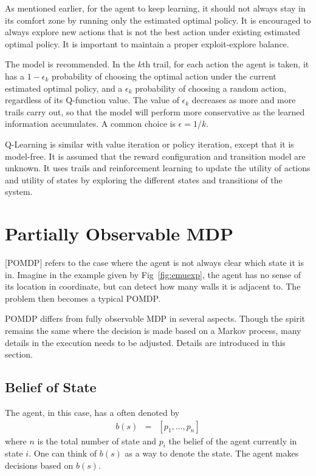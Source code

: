 As mentioned earlier, for the agent to keep learning, it should not always stay in its comfort zone by running only the estimated optimal policy. It is encouraged to always explore new actions that is not the best action under existing estimated optimal policy. It is important to maintain a proper exploit-explore balance.

The  model is recommended. In the $k$th trail, for each action the agent is taken, it has a $1-\epsilon_k$ probability of choosing the optimal action under the current estimated optimal policy, and a $\epsilon_k$ probability of choosing a random action, regardless of its Q-function value. The value of $\epsilon_k$ decreases as more and more trails carry out, so that the model will perform more conservative as the learned information accumulates. A common choice is $\epsilon = 1/k$.

Q-Learning is similar with value iteration or policy iteration, except that it is model-free. It is assumed that the reward configuration and transition model are unknown. It uses trails and reinforcement learning to update the utility of actions and utility of states by exploring the different states and transitions of the system.

\section{Partially Observable MDP} \label{sec:pomdp}

[POMDP] refers to the case where the agent is not always clear which state it is in. Imagine in the example given by Fig~\ref{fig:emuexp}, the agent has no sense of its location in coordinate, but can detect how many walls it is adjacent to. The problem then becomes a typical POMDP. 

POMDP differs from fully observable MDP in several aspects. Though the spirit remains the same where the decision is made based on a Markov process, many details in the execution needs to be adjusted. Details are introduced in this section.

\subsection{Belief of State}

The agent, in this case, has a  often denoted by
\begin{eqnarray}
	b(s) &=& \left[p_1, \ldots, p_n\right] \nonumber
\end{eqnarray}
where $n$ is the total number of state and $p_i$ the belief of the agent currently in state $i$. One can think of $b(s)$ as a way to denote the state. The agent makes decisions based on $b(s)$.

